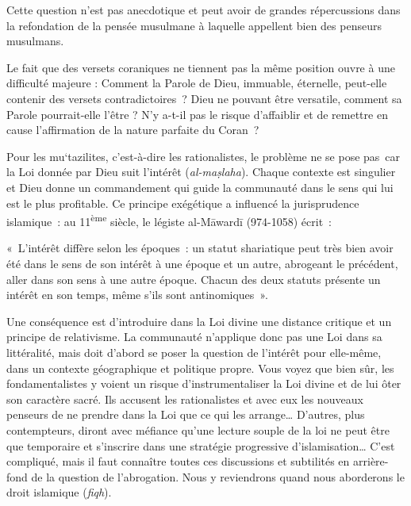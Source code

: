 Cette question n'est pas anecdotique et peut avoir de grandes
répercussions dans la refondation de la pensée musulmane à laquelle
appellent bien des penseurs musulmans.


Le fait que des versets coraniques ne tiennent pas la même position
ouvre à une difficulté majeure : Comment la Parole de Dieu, immuable,
éternelle, peut-elle contenir des versets contradictoires~? Dieu ne
pouvant être versatile, comment sa Parole pourrait-elle l'être ? N'y
a-t-il pas le risque d'affaiblir et de remettre en cause l'affirmation
de la nature parfaite du Coran~?

Pour les mu`tazilites, c'est-à-dire les rationalistes, le problème ne se
pose pas~car la Loi donnée par Dieu suit l'intérêt (\emph{al-maṣlaha}).
Chaque contexte est singulier et Dieu donne un commandement qui guide la
communauté dans le sens qui lui est le plus profitable. Ce principe
exégétique a influencé la jurisprudence islamique~: au
11\textsuperscript{ème} siècle, le légiste al-Māwardī (974-1058) écrit~:

«~L'intérêt diffère selon les époques~: un statut shariatique peut très
bien avoir été dans le sens de son intérêt à une époque et un autre,
abrogeant le précédent, aller dans son sens à une autre époque. Chacun
des deux statuts présente un intérêt en son temps, même s'ils sont
antinomiques~».

Une conséquence est d'introduire dans la Loi divine une distance
critique et un principe de relativisme. La communauté n'applique donc
pas une Loi dans sa littéralité, mais doit d'abord se poser la question
de l'intérêt pour elle-même, dans un contexte géographique et politique
propre. Vous voyez que bien sûr, les fondamentalistes y voient un risque
d'instrumentaliser la Loi divine et de lui ôter son caractère sacré. Ils
accusent les rationalistes et avec eux les nouveaux penseurs de ne
prendre dans la Loi que ce qui les arrange\ldots{} D'autres, plus
contempteurs, diront avec méfiance qu'une lecture souple de la loi ne
peut être que temporaire et s'inscrire dans une stratégie progressive
d'islamisation\ldots{} C'est compliqué, mais il faut connaître toutes
ces discussions et subtilités en arrière-fond de la question de
l'abrogation. Nous y reviendrons quand nous aborderons le droit
islamique (\emph{fiqh}).


